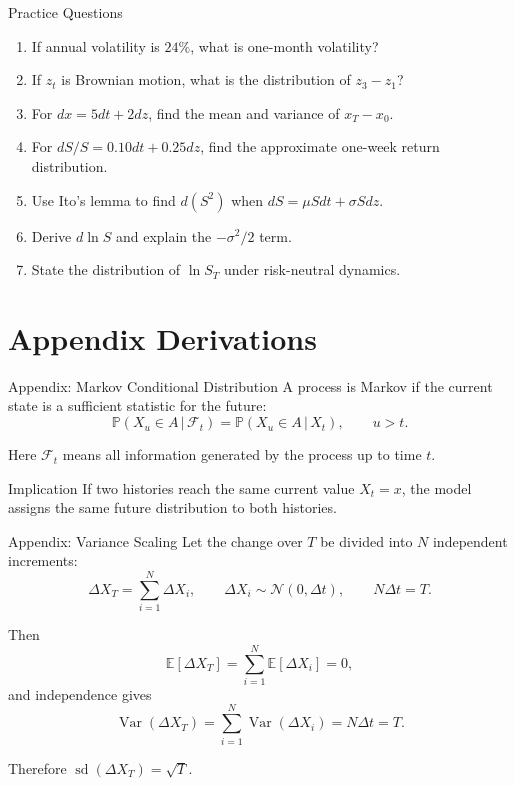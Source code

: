 \documentclass[aspectratio=169,11pt]{beamer}
\newcommand{\dt}{\Delta t}
\newcommand{\E}{\mathbb{E}}
\newcommand{\Var}{\operatorname{Var}}
\newcommand{\Prob}{\mathbb{P}}
\newcommand{\Normal}{\mathcal{N}}
\newcommand{\given}{\,|\,}
\newcommand{\Ito}{Ito}
\begin{document}
\begin{frame}{Practice Questions}
    \begin{enumerate}
        \item If annual volatility is \(24\%\), what is one-month volatility?
        \item If \(z_t\) is Brownian motion, what is the distribution of \(z_3-z_1\)?
        \item For \(dx=5dt+2dz\), find the mean and variance of \(x_T-x_0\).
        \item For \(dS/S=0.10dt+0.25dz\), find the approximate one-week return distribution.
        \item Use \Ito's lemma to find \(d(S^2)\) when \(dS=\mu Sdt+\sigma Sdz\).
        \item Derive \(d\ln S\) and explain the \(-\sigma^2/2\) term.
        \item State the distribution of \(\ln S_T\) under risk-neutral dynamics.
    \end{enumerate}
\end{frame}

\appendix
\section{Appendix Derivations}

\begin{frame}[label=deriv_markov]{Appendix: Markov Conditional Distribution}
    A process is Markov if the current state is a sufficient statistic for the future:
    \[
        \Prob(X_u\in A \given \mathcal{F}_t)
        =
        \Prob(X_u\in A \given X_t),
        \qquad u>t.
    \]

    Here \(\mathcal{F}_t\) means all information generated by the process up to time \(t\).

    \begin{block}{Implication}
        If two histories reach the same current value \(X_t=x\), the model assigns the same future distribution to both histories.
    \end{block}

    \hyperlink{markov_main}{}
\end{frame}

\begin{frame}[label=deriv_variance_scaling]{Appendix: Variance Scaling}
    Let the change over \(T\) be divided into \(N\) independent increments:
    \[
        \Delta X_T=\sum_{i=1}^N \Delta X_i,
        \qquad
        \Delta X_i\sim\Normal(0,\dt),
        \qquad
        N\dt=T.
    \]

    Then
    \[
        \E[\Delta X_T]
        =
        \sum_{i=1}^N \E[\Delta X_i]
        =
        0,
    \]
    and independence gives
    \[
        \Var(\Delta X_T)
        =
        \sum_{i=1}^N \Var(\Delta X_i)
        =
        N\dt=T.
    \]

    Therefore \(\operatorname{sd}(\Delta X_T)=\sqrt{T}\).

    \hyperlink{variance_scaling_main}{}
\end{frame}
\end{document}
